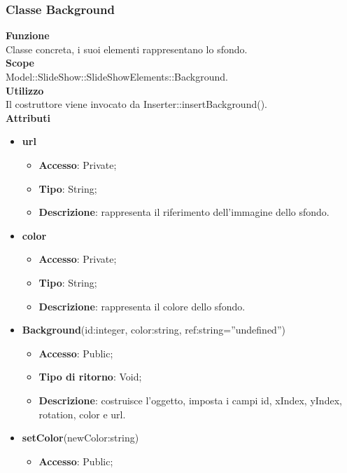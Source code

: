 {	\subsubsection{Classe Background}{
		\label{Background}
		\textbf{Funzione}\\
			\indent Classe concreta, i suoi elementi rappresentano lo sfondo.\\
	   	\textbf{Scope}\\
			\indent Model::SlideShow::SlideShowElements::Background.\\
		\textbf{Utilizzo}\\
			\indent Il costruttore viene invocato da Inserter::insertBackground().\\
		\textbf{Attributi}
		\begin{itemize}
			\item \textbf{url}
			\begin{itemize}
				\item \textbf{Accesso}: Private;
				\item \textbf{Tipo}: String;
				\item \textbf{Descrizione}: rappresenta il riferimento dell’immagine dello sfondo.
			\end{itemize}
			\item \textbf{color}
			\begin{itemize}
				\item \textbf{Accesso}: Private;
				\item \textbf{Tipo}: String;
				\item \textbf{Descrizione}: rappresenta il colore dello sfondo.
			\end{itemize}
		\end{itemize}
		\begin{itemize}
			\item \textbf{Background}(id:integer, color:string, ref:string=”undefined”)
			\begin{itemize}
				\item \textbf{Accesso}: Public;
				\item \textbf{Tipo di ritorno}: Void;
				\item \textbf{Descrizione}: costruisce l’oggetto, imposta i campi id, xIndex, yIndex, rotation, color e url.
			\end{itemize}
			\item \textbf{setColor}(newColor:string)
			\begin{itemize}
				\item \textbf{Accesso}: Public;

\end{itemize}
\end{itemize}}}
